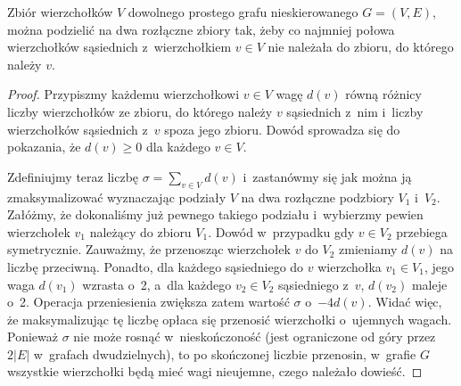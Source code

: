 \subproblem %
\begin{twierdzenie}
	Zbiór wierzchołków $V$ dowolnego prostego grafu nieskierowanego $G=(V,E)$, można podzielić na dwa rozłączne zbiory tak, żeby co najmniej połowa wierzchołków sąsiednich z~wierzchołkiem $v\in V$ nie należała do zbioru, do którego należy $v$.
\end{twierdzenie}
\begin{proof}
Przypiszmy każdemu wierzchołkowi $v\in V$ wagę $d(v)$ równą różnicy liczby wierzchołków ze zbioru, do którego należy $v$ sąsiednich z~nim i~liczby wierzchołków sąsiednich z~$v$ spoza jego zbioru. Dowód sprowadza się do pokazania, że $d(v)\ge0$ dla każdego $v\in V$\!.

Zdefiniujmy teraz liczbę $\sigma=\sum_{v\in V}d(v)$ i~zastanówmy się jak można ją zmaksymalizować wyznaczając podziały $V$ na dwa rozłączne podzbiory $V_1$ i~$V_2$. Załóżmy, że dokonaliśmy już pewnego takiego podziału i~wybierzmy pewien wierzchołek $v_1$ należący do zbioru $V_1$. Dowód w~przypadku gdy $v\in V_2$ przebiega symetrycznie. Zauważmy, że przenosząc wierzchołek $v$ do $V_2$ zmieniamy $d(v)$ na liczbę przeciwną. Ponadto, dla każdego sąsiedniego do $v$ wierzchołka $v_1\in V_1$, jego waga $d(v_1)$ wzrasta o~2, a~dla każdego $v_2\in V_2$ sąsiedniego z~$v$, $d(v_2)$ maleje o~2. Operacja przeniesienia zwiększa zatem wartość $\sigma$ o~$-4d(v)$. Widać więc, że maksymalizując tę liczbę opłaca się przenosić wierzchołki o~ujemnych wagach. Ponieważ $\sigma$ nie może rosnąć w~nieskończoność (jest ograniczone od góry przez $2|E|$ w~grafach dwudzielnych), to po skończonej liczbie przenosin, w~grafie $G$ wszystkie wierzchołki będą mieć wagi nieujemne, czego należało dowieść.
\end{proof}

